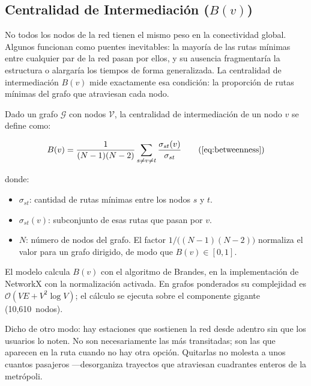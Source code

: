 \subsection{Centralidad de Intermediación (\texorpdfstring{$B(v)$}{B(v)})}
\label{subsec:fase3-centralidad}

No todos los nodos de la red tienen el mismo peso en la conectividad global.
Algunos funcionan como puentes inevitables: la mayoría de las rutas mínimas
entre cualquier par de la red pasan por ellos, y su ausencia fragmentaría la
estructura o alargaría los tiempos de forma generalizada. La centralidad de
intermediación $B(v)$ mide exactamente esa condición: la proporción de rutas
mínimas del grafo que atraviesan cada nodo.

Dado un grafo $\mathcal{G}$ con nodos $\mathcal{V}$, la centralidad de
intermediación de un nodo $v$ se define como:

\begin{equation*}
    B(v) = \frac{1}{(N-1)(N-2)} \sum_{s \neq v \neq t} \frac{\sigma_{st}(v)}{\sigma_{st}}
    \tag{\ref{eq:betweenness}}
\end{equation*}

\noindent donde:
\begin{itemize}
    \item $\sigma_{st}$: cantidad de rutas mínimas entre los nodos $s$ y $t$.
    \item $\sigma_{st}(v)$: subconjunto de esas rutas que pasan por $v$.
    \item $N$: número de nodos del grafo. El factor $1/\bigl((N-1)(N-2)\bigr)$
    normaliza el valor para un grafo dirigido, de modo que $B(v) \in [0, 1]$.
\end{itemize}

El modelo calcula $B(v)$ con el algoritmo de Brandes, en la implementación de
NetworkX con la normalización activada. En grafos ponderados su complejidad es
$\mathcal{O}(VE + V^2 \log V)$; el cálculo se ejecuta sobre el componente
gigante (10{,}610~nodos).

Dicho de otro modo: hay estaciones que sostienen la red desde adentro sin que
los usuarios lo noten. No son necesariamente las más transitadas; son las que
aparecen en la ruta cuando no hay otra opción. Quitarlas no molesta a unos
cuantos pasajeros —desorganiza trayectos que atraviesan cuadrantes enteros de la
metrópoli.

